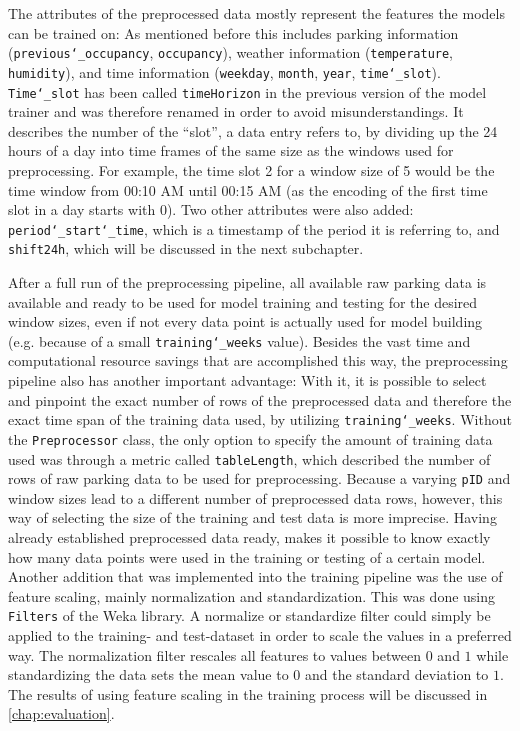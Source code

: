The attributes of the preprocessed data mostly represent the features the models can be trained on: As mentioned before this includes parking information (\texttt{previous\char`_occupancy}, \texttt{occupancy}), weather information (\texttt{temperature}, \texttt{humidity}), and time information (\texttt{weekday}, \texttt{month}, \texttt{year}, \texttt{time\char`_slot}). \texttt{Time\char`_slot} has been called \texttt{timeHorizon} in the previous version of the model trainer and was therefore renamed in order to avoid misunderstandings. It describes the number of the “slot”, a data entry refers to, by dividing up the 24 hours of a day into time frames of the same size as the windows used for preprocessing. For example, the time slot 2 for a window size of 5 would be the time window from 00:10 AM until 00:15 AM (as the encoding of the first time slot in a day starts with 0). Two other attributes were also added: \texttt{period\char`_start\char`_time}, which is a timestamp of the period it is referring to, and \texttt{shift24h}, which will be discussed in the next subchapter.  

After a full run of the preprocessing pipeline, all available raw parking data is available and ready to be used for model training and testing for the desired window sizes, even if not every data point is actually used for model building (e.g. because of a small \texttt{training\char`_weeks} value). Besides the vast time and computational resource savings that are accomplished this way, the preprocessing pipeline also has another important advantage: With it, it is possible to select and pinpoint the exact number of rows of the preprocessed data and therefore the exact time span of the training data used, by utilizing \texttt{training\char`_weeks}. Without the \texttt{Preprocessor} class, the only option to specify the amount of training data used was through a metric called \texttt{tableLength}, which described the number of rows of raw parking data to be used for preprocessing. Because a varying \texttt{pID} and window sizes lead to a different number of preprocessed data rows, however, this way of selecting the size of the training and test data is more imprecise. Having already established preprocessed data ready, makes it possible to know exactly how many data points were used in the training or testing of a certain model. Another addition that was implemented into the training pipeline was the use of feature scaling, mainly normalization and standardization. This was done using \texttt{Filters} of the Weka library. A normalize or standardize filter could simply be applied to the training- and test-dataset in order to scale the values in a preferred way. The normalization filter rescales all features to values between $0$ and $1$ while standardizing the data sets the mean value to 0 and the standard deviation to $1$. The results of using feature scaling in the training process will be discussed in \autoref{chap:evaluation}.




